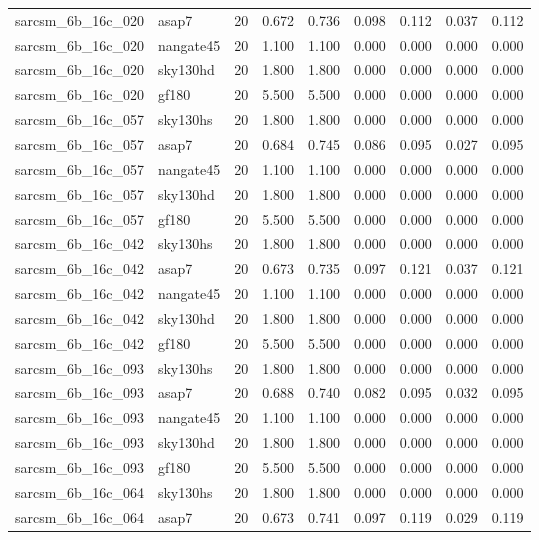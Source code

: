 \begin{tabular}{llrrrrrrr}
sarcsm\_6b\_16c\_020 & asap7 & 20 & 0.672 & 0.736 & 0.098 & 0.112 & 0.037 & 0.112 \\
sarcsm\_6b\_16c\_020 & nangate45 & 20 & 1.100 & 1.100 & 0.000 & 0.000 & 0.000 & 0.000 \\
sarcsm\_6b\_16c\_020 & sky130hd & 20 & 1.800 & 1.800 & 0.000 & 0.000 & 0.000 & 0.000 \\
sarcsm\_6b\_16c\_020 & gf180 & 20 & 5.500 & 5.500 & 0.000 & 0.000 & 0.000 & 0.000 \\
sarcsm\_6b\_16c\_057 & sky130hs & 20 & 1.800 & 1.800 & 0.000 & 0.000 & 0.000 & 0.000 \\
sarcsm\_6b\_16c\_057 & asap7 & 20 & 0.684 & 0.745 & 0.086 & 0.095 & 0.027 & 0.095 \\
sarcsm\_6b\_16c\_057 & nangate45 & 20 & 1.100 & 1.100 & 0.000 & 0.000 & 0.000 & 0.000 \\
sarcsm\_6b\_16c\_057 & sky130hd & 20 & 1.800 & 1.800 & 0.000 & 0.000 & 0.000 & 0.000 \\
sarcsm\_6b\_16c\_057 & gf180 & 20 & 5.500 & 5.500 & 0.000 & 0.000 & 0.000 & 0.000 \\
sarcsm\_6b\_16c\_042 & sky130hs & 20 & 1.800 & 1.800 & 0.000 & 0.000 & 0.000 & 0.000 \\
sarcsm\_6b\_16c\_042 & asap7 & 20 & 0.673 & 0.735 & 0.097 & 0.121 & 0.037 & 0.121 \\
sarcsm\_6b\_16c\_042 & nangate45 & 20 & 1.100 & 1.100 & 0.000 & 0.000 & 0.000 & 0.000 \\
sarcsm\_6b\_16c\_042 & sky130hd & 20 & 1.800 & 1.800 & 0.000 & 0.000 & 0.000 & 0.000 \\
sarcsm\_6b\_16c\_042 & gf180 & 20 & 5.500 & 5.500 & 0.000 & 0.000 & 0.000 & 0.000 \\
sarcsm\_6b\_16c\_093 & sky130hs & 20 & 1.800 & 1.800 & 0.000 & 0.000 & 0.000 & 0.000 \\
sarcsm\_6b\_16c\_093 & asap7 & 20 & 0.688 & 0.740 & 0.082 & 0.095 & 0.032 & 0.095 \\
sarcsm\_6b\_16c\_093 & nangate45 & 20 & 1.100 & 1.100 & 0.000 & 0.000 & 0.000 & 0.000 \\
sarcsm\_6b\_16c\_093 & sky130hd & 20 & 1.800 & 1.800 & 0.000 & 0.000 & 0.000 & 0.000 \\
sarcsm\_6b\_16c\_093 & gf180 & 20 & 5.500 & 5.500 & 0.000 & 0.000 & 0.000 & 0.000 \\
sarcsm\_6b\_16c\_064 & sky130hs & 20 & 1.800 & 1.800 & 0.000 & 0.000 & 0.000 & 0.000 \\
sarcsm\_6b\_16c\_064 & asap7 & 20 & 0.673 & 0.741 & 0.097 & 0.119 & 0.029 & 0.119 \\

\end{tabular}

